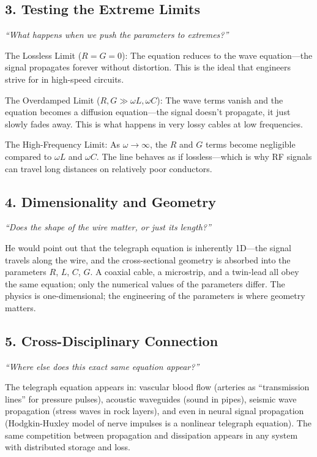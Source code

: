 \documentclass[11pt,openright]{book}
\begin{document}
\subsection*{3. Testing the Extreme Limits}
\textit{``What happens when we push the parameters to extremes?''}

The Lossless Limit ($R = G = 0$): The equation reduces to the wave equation---the signal propagates forever without distortion. This is the ideal that engineers strive for in high-speed circuits.

The Overdamped Limit ($R, G \gg \omega L, \omega C$): The wave terms vanish and the equation becomes a diffusion equation---the signal doesn't propagate, it just slowly fades away. This is what happens in very lossy cables at low frequencies.

The High-Frequency Limit: As $\omega \to \infty$, the $R$ and $G$ terms become negligible compared to $\omega L$ and $\omega C$. The line behaves as if lossless---which is why RF signals can travel long distances on relatively poor conductors.

\subsection*{4. Dimensionality and Geometry}
\textit{``Does the shape of the wire matter, or just its length?''}

He would point out that the telegraph equation is inherently 1D---the signal travels along the wire, and the cross-sectional geometry is absorbed into the parameters $R$, $L$, $C$, $G$. A coaxial cable, a microstrip, and a twin-lead all obey the same equation; only the numerical values of the parameters differ. The physics is one-dimensional; the engineering of the parameters is where geometry matters.

\subsection*{5. Cross-Disciplinary Connection}
\textit{``Where else does this exact same equation appear?''}

The telegraph equation appears in: vascular blood flow (arteries as ``transmission lines'' for pressure pulses), acoustic waveguides (sound in pipes), seismic wave propagation (stress waves in rock layers), and even in neural signal propagation (Hodgkin-Huxley model of nerve impulses is a nonlinear telegraph equation). The same competition between propagation and dissipation appears in any system with distributed storage and loss.
\end{document}
